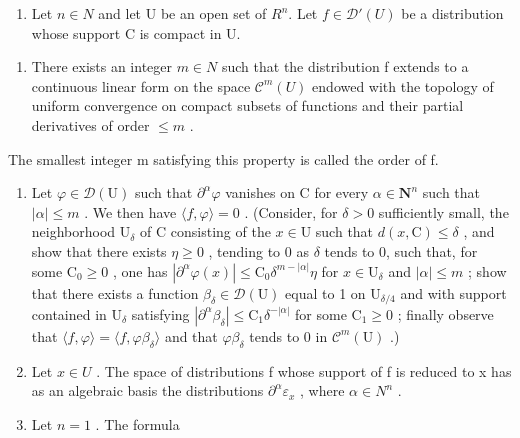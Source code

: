 \begin{enumerate}
\def\labelenumi{\arabic{enumi})}
\setcounter{enumi}{23}
\tightlist
\item
  Let \(n \in N\) and let U be an open set of \(R^{n}\). Let \(f \in \mathcal{D}'(U)\) be a distribution whose support C is compact in U.
\end{enumerate}

\begin{enumerate}
\def\labelenumi{\alph{enumi})}
\tightlist
\item
  There exists an integer \(m \in N\) such that the distribution f extends to a continuous linear form on the space \(\mathcal{C}^{m}(U)\) endowed with the topology of uniform convergence on compact subsets of functions and their partial derivatives of order \(\leqslant m\) .
\end{enumerate}

The smallest integer m satisfying this property is called the order of f.

\begin{enumerate}
\def\labelenumi{\alph{enumi})}
\setcounter{enumi}{1}
\item
  Let \(\varphi \in \mathcal{D}(\mathrm{U})\) such that \(\partial^{\alpha}\varphi\) vanishes on C for every \(\alpha \in \mathbf{N}^{n}\) such that \(|\alpha| \leqslant m\) . We then have \(\langle f, \varphi \rangle = 0\) . (Consider, for \(\delta > 0\) sufficiently small, the neighborhood \(\mathrm{U}_{\delta}\) of C consisting of the \(x \in \mathrm{U}\) such that \(d(x, \mathrm{C}) \leqslant \delta\) , and show that there exists \(\eta \geqslant 0\) , tending to 0 as \(\delta\) tends to 0, such that, for some \(\mathrm{C}_{0} \geqslant 0\) , one has \(|\partial^{\alpha}\varphi(x)| \leqslant \mathrm{C}_{0}\delta^{m-|\alpha|}\eta\) for \(x \in \mathrm{U}_{\delta}\) and \(|\alpha| \leqslant m\) ; show that there exists a function \(\beta_{\delta} \in \mathcal{D}(\mathrm{U})\) equal to 1 on \(\mathrm{U}_{\delta/4}\) and with support contained in \(\mathrm{U}_{\delta}\) satisfying \(|\partial^{\alpha}\beta_{\delta}| \leqslant \mathrm{C}_{1}\delta^{-|\alpha|}\) for some \(\mathrm{C}_{1} \geqslant 0\) ; finally observe that \(\langle f, \varphi \rangle = \langle f, \varphi\beta_{\delta} \rangle\) and that \(\varphi\beta_{\delta}\) tends to 0 in \(\mathcal{C}^{m}(\mathrm{U})\) .)
\item
  Let \(x \in U\) . The space of distributions f whose support of f is reduced to x has as an algebraic basis the distributions \(\partial^{\alpha}\varepsilon_{x}\) , where \(\alpha \in N^{n}\) .
\item
  Let \(n = 1\) . The formula
\end{enumerate}

